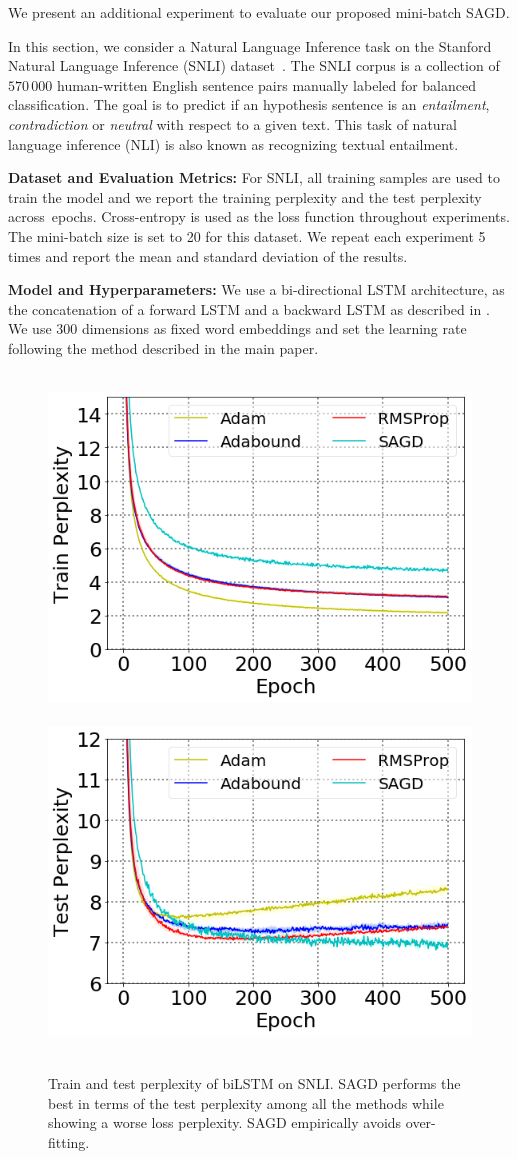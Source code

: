 We present an additional experiment to evaluate our proposed mini-batch \textsc{SAGD}.

In this section, we consider a Natural Language Inference task on the Stanford Natural Language Inference (SNLI) dataset~\citep{bowman2015large}. 
The SNLI corpus is a collection of $570 \, 000$ human-written English sentence pairs manually labeled for balanced classification.
The goal is to predict if an hypothesis sentence is an \emph{entailment}, \emph{contradiction} or \emph{neutral} with respect to a given text.
This task of natural language inference (NLI) is also known as recognizing textual entailment. 

\textbf{Dataset and Evaluation Metrics:} 
For SNLI, all training samples are used to train the model and we report the training perplexity and the test perplexity across~epochs. 
Cross-entropy is used as the loss function throughout experiments. 
The mini-batch size is set to 20 for this dataset. 
We repeat each experiment 5 times and report the mean and standard deviation of the results.



\textbf{Model and Hyperparameters:} 
We use a bi-directional LSTM architecture, as the concatenation of a forward LSTM and a backward LSTM as described in \citep{conneau2017supervised}.
We use 300 dimensions as fixed word embeddings and set the learning rate following the method described in the main paper.


\begin{figure}[H] 
 \mbox{
\includegraphics[width = 0.48 \textwidth ]{figure/bilstmtrainwithlap.png}
\includegraphics[width = 0.48 \textwidth ]{figure/bilstmtestwithlap.png}
 }
 \vspace{-0.1in}
 \caption[]{Train and test perplexity of biLSTM on SNLI. 
 \textsc{SAGD} performs the best in terms of the test perplexity among all the methods while showing a worse loss perplexity. SAGD empirically avoids over-fitting.
} 
 \label{fig:snli}\vspace{-0.05in}
\end{figure}

